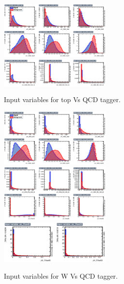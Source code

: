 \documentclass{cernrep}
\begin{document}
\begin{figure}[!htb]\centering
\includegraphics[width=0.495\textwidth]{Fig/TMVA/thad_vs_QCD/variables_id_c1.eps}
\includegraphics[width=0.495\textwidth]{Fig/TMVA/thad_vs_QCD/variables_id_c2.eps}
\caption{Input variables for top Vs QCD tagger.}
\label{fig:TMVA_inputs_t}
\end{figure}

\begin{figure}[!htb]\centering
\includegraphics[width=0.495\textwidth]{Fig/TMVA/Whad_vs_QCD/variables_id_c1.eps}
\includegraphics[width=0.495\textwidth]{Fig/TMVA/Whad_vs_QCD/variables_id_c2.eps}
\includegraphics[width=0.495\textwidth]{Fig/TMVA/Whad_vs_QCD/variables_id_c3.eps}
\caption{Input variables for W Vs QCD tagger.}
\label{fig:TMVA_inputs_t}
\end{figure}
\end{document}
